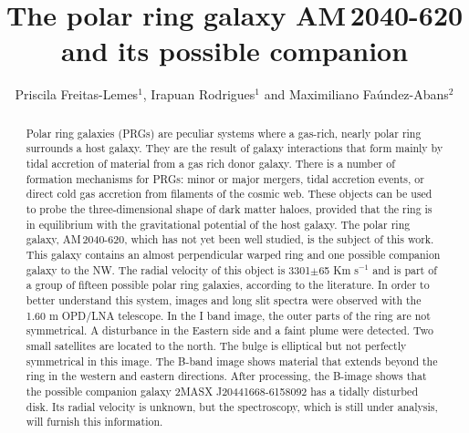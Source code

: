 \documentclass[aps,prd,twoside,twocolumn,floatfix,letterpaper]{revtex4-1}
\begin{document}
\title{The polar ring galaxy AM\,2040-620 and its possible companion}
\author{Priscila Freitas-Lemes$^{1}$, Irapuan Rodrigues$^{1}$ and Maximiliano
 Fa{\'u}ndez-Abans$^{2}$}



\begin{abstract}
Polar ring galaxies (PRGs) are peculiar systems where a gas-rich, nearly polar ring
surrounds a host galaxy. They are the result of galaxy interactions that form mainly 
by tidal accretion of material from a gas rich donor galaxy. There is a 
number of formation mechanisms for PRGs: minor or major mergers, tidal accretion events,
or direct cold gas accretion from filaments of the cosmic web. These 
objects can be used to probe the three-dimensional shape of dark matter haloes, provided
that the ring is in equilibrium with the gravitational potential of the host galaxy. 
The polar ring galaxy, AM\,2040-620, which has not yet been well studied, is the subject 
of this work. This galaxy contains an almost perpendicular warped ring and one possible 
companion galaxy to the NW. 
The radial velocity of this object is 3301$\pm$65 Km s$^{-1}$ 
and is part of a group of fifteen possible polar ring galaxies, according to the literature. 
In order to better understand this system, images and long slit spectra were observed with 
the 1.60 m OPD/LNA telescope.
In the I band image, the outer parts of the ring are not symmetrical. A disturbance in 
the Eastern side and a faint plume were detected. Two small satellites are located to 
the north. The bulge is elliptical but not perfectly symmetrical in this image. The B-band
image shows material that extends beyond the ring in the western and eastern directions.
After processing, the B-image shows that the possible companion galaxy 
2MASX J20441668-6158092 has a tidally disturbed disk. Its radial velocity is unknown, 
but the spectroscopy, which is still under analysis, will furnish this information. 
\end{abstract}

\maketitle\thispagestyle{plain}
\end{document}
